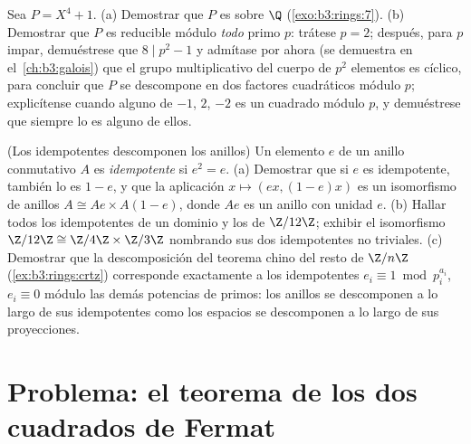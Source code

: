 \begin{exercise}[$\star\star\star$]\label{exo:b3:rings:11}
Sea $P = X^4 + 1$. (a) Demostrar que $P$ es
 sobre $\Q$
(\cref{exo:b3:rings:7}).
(b) Demostrar que $P$ es reducible módulo \emph{todo} primo $p$: trátese
$p = 2$; después, para $p$ impar, demuéstrese que $8 \mid p^2 - 1$ y
admítase por ahora (se demuestra en el~\cref{ch:b3:galois}) que el grupo
multiplicativo del cuerpo de $p^2$ elementos es cíclico, para concluir
que $P$ se descompone en dos factores cuadráticos módulo $p$;
explicítense cuando alguno de $-1$, $2$, $-2$ es un cuadrado módulo $p$,
y demuéstrese que siempre lo es alguno de ellos.
\end{exercise}

\begin{exercise}[$\star\star$]\label{exo:b3:rings:12}
(Los idempotentes descomponen los anillos) Un elemento $e$ de un anillo
conmutativo $A$ es \emph{idempotente} si $e^2 = e$. (a) Demostrar que si
$e$ es idempotente, también lo es $1 - e$, y que la aplicación
$x \mapsto (ex, (1-e)x)$ es un isomorfismo de anillos $A
\cong Ae \times A(1-e)$, donde $Ae$ es un anillo con unidad $e$. (b)
Hallar todos los idempotentes de un dominio y los de $\Z/12\Z$; exhibir
el isomorfismo $\Z/12\Z \cong \Z/4\Z \times \Z/3\Z$ nombrando sus dos
idempotentes no triviales. (c) Demostrar que la descomposición del
teorema chino del resto de $\Z/n\Z$ (\cref{ex:b3:rings:crtz})
corresponde exactamente a los idempotentes
$e_i \equiv 1 \bmod p_i^{a_i}$, $e_i \equiv 0$ módulo las demás
potencias de primos: los anillos se descomponen a lo largo de sus
idempotentes como los espacios se descomponen a lo largo de sus
proyecciones.
\end{exercise}

\section{Problema: el teorema de los dos cuadrados de Fermat}

